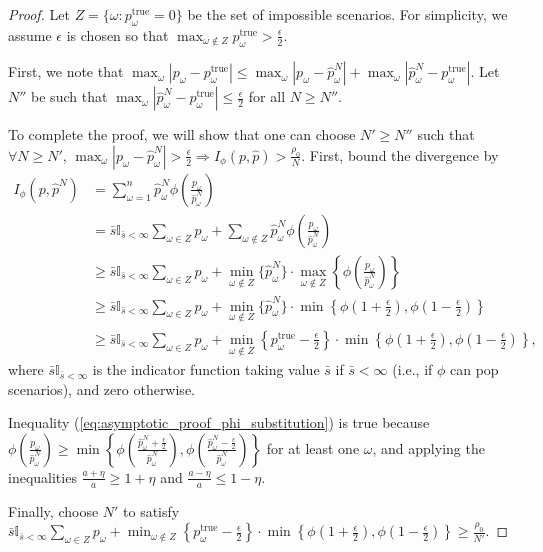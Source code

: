 \documentclass[ijoc,nonblindrev]{informs3} %
\newcommand{\ptrue}{p^{\text{true}}}
\begin{document}
\begin{proof}
	Let $Z = \{\omega : \ptrue_\omega = 0\}$ be the set of impossible scenarios.
	For simplicity, we assume $\epsilon$ is chosen so that $\max_{\omega \notin Z} \ptrue_\omega > \frac{\epsilon}{2}$.
	
	First, we note that $\max_\omega |p_\omega - \ptrue_\omega| \leq \max_\omega |p_\omega - \hat{p}^N_\omega| + \max_\omega |\hat{p}^N_\omega - \ptrue_\omega|$.
	Let $N''$ be such that $\max_\omega |\hat{p}^N_\omega - \ptrue_\omega| \leq \frac{\epsilon}{2}$ for all $N \geq N''$.
	
	To complete the proof, we will show that one can choose $N' \geq N''$ such that $\forall N \geq N'$, $\max_\omega |p_\omega - \hat{p}^N_\omega| > \frac{\epsilon}{2} \Rightarrow I_\phi(p,\hat{p}) > \frac{\rho_0}{N}$.
	First, bound the divergence by
	\begin{align}
		I_{\phi}(p,\hat{p}^N) & = \sum_{\omega=1}^n \hat{p}^N_\omega \phi\left( \frac{p_\omega}{\hat{p}^N_\omega} \right) \nonumber \\
		& = \bar{s} \mathbb{I}_{\bar{s} < \infty} \sum_{\omega \in Z} p_\omega + \sum_{\omega \notin Z} \hat{p}^N_\omega \phi\left( \frac{p_\omega}{\hat{p}^N_\omega} \right) \nonumber \\
		& \geq \bar{s} \mathbb{I}_{\bar{s} < \infty} \sum_{\omega \in Z} p_\omega + \min_{\omega \notin Z} \{\hat{p}^N_\omega\} \cdot \max_{\omega \notin Z} \left\{ \phi \left( \frac{p_\omega}{\hat{p}^N_\omega} \right) \right\} \nonumber \\
		& \geq \bar{s} \mathbb{I}_{\bar{s} < \infty} \sum_{\omega \in Z} p_\omega  + \min_{\omega \notin Z} \{\hat{p}^N_\omega\} \cdot \min\left\{ \phi\left(1+\frac{\epsilon}{2}\right), \phi\left(1-\frac{\epsilon}{2}\right) \right\} \label{eq:asymptotic_proof_phi_substitution} \\
		& \geq \bar{s} \mathbb{I}_{\bar{s} < \infty} \sum_{\omega \in Z} p_\omega + \min_{\omega \notin Z} \left\{ \ptrue_\omega - \frac{\epsilon}{2} \right\} \cdot \min\left\{ \phi\left(1+\frac{\epsilon}{2}\right), \phi\left(1-\frac{\epsilon}{2}\right) \right\} \nonumber,
	\end{align}
	where $\bar{s}\mathbb{I}_{\bar{s} < \infty}$ is the indicator function taking value $\bar{s}$ if $\bar{s} < \infty$ (i.e., if $\phi$ can pop scenarios), and zero otherwise.
	
	Inequality (\ref{eq:asymptotic_proof_phi_substitution}) is true because $\phi \left( \frac{p_\omega}{\hat{p}^N_\omega} \right) \geq \min\left\{ \phi\left( \frac{\hat{p}^N_\omega+\tfrac{\epsilon}{2}}{\hat{p}^N_\omega} \right), \phi\left( \frac{\hat{p}^N_\omega-\tfrac{\epsilon}{2}}{\hat{p}^N_\omega} \right) \right\}$ for at least one $\omega$, and applying the inequalities $\frac{a+\eta}{a} \geq 1 + \eta$ and $\frac{a-\eta}{a} \leq 1-\eta$.
	
	Finally, choose $N'$ to satisfy $\bar{s} \mathbb{I}_{\bar{s} < \infty} \sum_{\omega \in Z} p_\omega + \min_{\omega \notin Z} \left\{ \ptrue_\omega - \frac{\epsilon}{2} \right\} \cdot \min\left\{ \phi\left(1+\frac{\epsilon}{2}\right), \phi\left(1-\frac{\epsilon}{2}\right) \right\} \geq \frac{\rho_0}{N'}$.
\end{proof}
\end{document}

